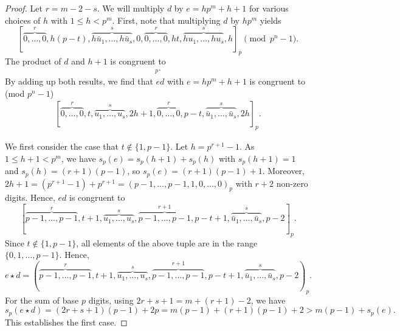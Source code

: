 \documentclass[12pt]{article}
\newcommand{\comp}[1]{\bar{#1}}
\newcommand{\wt}{s_p}
\begin{document}
\begin{proof}
Let $r = m-2 - s$.
We will multiply $d$ by $e = hp^m + h + 1$ for various choices of $h$ with $1 \leq h < p^m$. First, note that multiplying $d$ by $hp^m$ yields
\[[\overbrace{0,\dots,0}^{r},h(p-t),\overbrace{h\comp{u}_1,\dots,h\comp{u}_s}^{s},0,\overbrace{0,\dots,0}^{r},ht,\overbrace{hu_1,\dots,hu_s}^{s},h]_p \pmod {p^n-1}.\]
The product of $d$ and $h+1$ is congruent to
\begin{align*}
[&\overbrace{0,\dots,0}^{r},ht+t,\;\;\;\;\;\;\;\;\;\;\;\;\,\overbrace{hu_1+u_1,\dots,hu_s+u_s}^{s},h+1, \\
&\overbrace{0,\dots,0}^r,(h+1)(p-t),\overbrace{h\comp{u}_1 + \comp{u}_1,\dots,h\comp{u}_s + \comp{u}_s}^{s},0]_p.
\end{align*}
By adding up both results, we find that $ed$ with $e = h p^m + h + 1$ is congruent to  (mod $p^n - 1$)
\begin{align}
\label{eq:de}
    [\overbrace{0,\dots,0}^r,t,\overbrace{u_1,\dots,u_s}^s,2h+1,\overbrace{0,\dots,0}^r,p-t,\overbrace{\comp{u}_1,\dots,\comp{u}_s}^s,2h]_p.
\end{align}

We first consider the case that $t \notin \{1,p-1\}$.
Let $h = p^{r + 1} - 1$. As $1 \leq h+1 <p^m$, we have $\wt(e) = \wt(h+1) + \wt(h)$ with $\wt(h+1) = 1$ and $\wt(h) = (r+1)(p-1)$, so $\wt(e) = (r+1)(p-1) + 1$.
Moreover, $2h + 1 = (p^{r + 1} - 1) + p^{r + 1} = (p - 1, \ldots, p - 1, 1, 0, \ldots, 0)_p$ with $r + 2$ non-zero digits.
Hence, $ed$ is congruent to
\[[\overbrace{p-1,\dots,p-1}^r,t+1,\overbrace{u_1,\dots,u_s}^s,\overbrace{p-1,\dots,p-1}^{r+1},p-t+1,\overbrace{\comp{u}_1,\dots,\comp{u}_s}^s,p-2]_p.\]
Since $t \notin \{1,p-1\}$, all elements of the above tuple are in the range $\{0, 1, \ldots, p - 1\}$. Hence,
\[e \star d = (\overbrace{p-1,\dots,p-1}^r,t+1,\overbrace{u_1,\dots,u_s}^s,\overbrace{p-1,\dots,p-1}^{r+1},p-t+1,\overbrace{\comp{u}_1,\dots,\comp{u}_s}^s,p-2)_p.\]
For the sum of base $p$ digits, using $2r + s + 1 = m + (r + 1) - 2$, we have
\begin{equation*}
\wt(e \star d) = (2r+s+1)(p-1) + 2p = m(p - 1) + (r + 1)(p - 1) + 2 > m(p - 1) + \wt(e).
\end{equation*}
This establishes the first case.


\end{proof}
\end{document}
